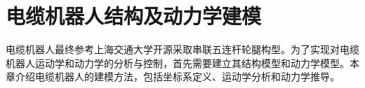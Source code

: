 \chapter{电缆机器人结构及动力学建模}\label{chap:model}

电缆机器人最终参考上海交通大学开源\cite{MelonMuet2023RM2023}采取串联五连杆轮腿构型。为了实现对电缆机器人运动学和动力学的分析与控制，首先需要建立其结构模型和动力学模型。本章介绍电缆机器人的建模方法，包括坐标系定义、运动学分析和动力学推导。











